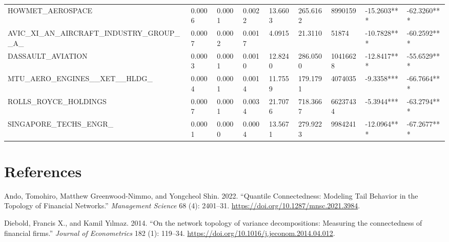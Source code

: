 \documentclass[
  letterpaper,
  DIV=11,
  numbers=noendperiod]{scrartcl}
\newlength{\cslhangindent}
\newlength{\cslentryspacingunit} %
\newenvironment{CSLReferences}[2] %
 {%
  \setlength{\parindent}{0pt}
  \ifodd #1
  \let\oldpar\par
  \def\par{\hangindent=\cslhangindent\oldpar}
  \fi
  \setlength{\parskip}{#2\cslentryspacingunit}
 }%
 {}
\begin{document}
\begin{table}[H]
{\begin{tabular}[t]{lllllllll}
\addlinespace
HOWMET\_AEROSPACE & 0.0006 & 0.0001 & 0.0022 & 13.6603 & 265.6162 & 8990159 & -15.2603*** & -62.3260***\\
AVIC\_XI\_AN\_AIRCRAFT\_INDUSTRY\_GROUP\_\_A\_ & 0.0007 & 0.0002 & 0.0017 & 4.0915 & 21.3110 & 51874 & -10.7828*** & -60.2592***\\
DASSAULT\_AVIATION & 0.0003 & 0.0001 & 0.0010 & 12.8240 & 286.0500 & 10416628 & -12.8417*** & -55.6529***\\
MTU\_AERO\_ENGINES\_\_XET\_\_HLDG\_ & 0.0004 & 0.0001 & 0.0014 & 11.7559 & 179.1791 & 4074035 & -9.3358*** & -66.7664***\\
ROLLS\_ROYCE\_HOLDINGS & 0.0007 & 0.0001 & 0.0034 & 21.7076 & 718.3667 & 66237434 & -5.3944*** & -63.2794***\\
\addlinespace
SINGAPORE\_TECHS\_ENGR\_ & 0.0001 & 0.0000 & 0.0004 & 13.5671 & 279.9223 & 9984241 & -12.0964*** & -67.2677***\\
\bottomrule
\end{tabular}}
\end{table}

\hypertarget{references}{%
\section*{References}\label{references}}

\hypertarget{refs}{}
\begin{CSLReferences}{1}{0}
\leavevmode{}%
Ando, Tomohiro, Matthew Greenwood-Nimmo, and Yongcheol Shin. 2022.
{``{Quantile Connectedness: Modeling Tail Behavior in the Topology of
Financial Networks}.''} \emph{Management Science} 68 (4): 2401--31.
\url{https://doi.org/10.1287/mnsc.2021.3984}.

\leavevmode{}%
Diebold, Francis X., and Kamil Yılmaz. 2014. {``{On the network topology
of variance decompositions: Measuring the connectedness of financial
firms}.''} \emph{Journal of Econometrics} 182 (1): 119--34.
\url{https://doi.org/10.1016/j.jeconom.2014.04.012}.

\end{CSLReferences}
\end{document}
